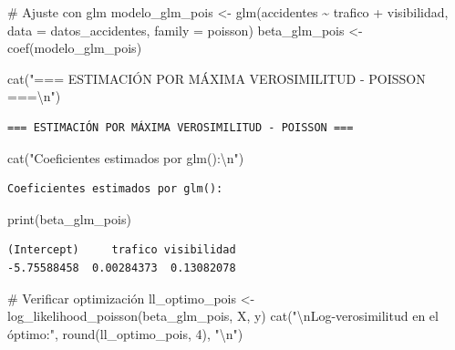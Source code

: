 \documentclass[
  letterpaper,
  DIV=11,
  numbers=noendperiod]{scrreprt}
\newenvironment{Shaded}{\begin{snugshade}}{\end{snugshade}}
\newcommand{\AttributeTok}[1]{\textcolor[rgb]{0.40,0.45,0.13}{#1}}
\newcommand{\CommentTok}[1]{\textcolor[rgb]{0.37,0.37,0.37}{#1}}
\newcommand{\DecValTok}[1]{\textcolor[rgb]{0.68,0.00,0.00}{#1}}
\newcommand{\FunctionTok}[1]{\textcolor[rgb]{0.28,0.35,0.67}{#1}}
\newcommand{\NormalTok}[1]{\textcolor[rgb]{0.00,0.23,0.31}{#1}}
\newcommand{\OtherTok}[1]{\textcolor[rgb]{0.00,0.23,0.31}{#1}}
\newcommand{\SpecialCharTok}[1]{\textcolor[rgb]{0.37,0.37,0.37}{#1}}
\newcommand{\StringTok}[1]{\textcolor[rgb]{0.13,0.47,0.30}{#1}}
\begin{document}
\begin{tcolorbox}
\begin{Shaded}
\begin{Highlighting}[]
\CommentTok{\# Ajuste con glm}
\NormalTok{modelo\_glm\_pois }\OtherTok{\textless{}{-}} \FunctionTok{glm}\NormalTok{(accidentes }\SpecialCharTok{\textasciitilde{}}\NormalTok{ trafico }\SpecialCharTok{+}\NormalTok{ visibilidad, }
                       \AttributeTok{data =}\NormalTok{ datos\_accidentes, }\AttributeTok{family =}\NormalTok{ poisson)}
\NormalTok{beta\_glm\_pois }\OtherTok{\textless{}{-}} \FunctionTok{coef}\NormalTok{(modelo\_glm\_pois)}

\FunctionTok{cat}\NormalTok{(}\StringTok{"=== ESTIMACIÓN POR MÁXIMA VEROSIMILITUD {-} POISSON ===}\SpecialCharTok{\textbackslash{}n}\StringTok{"}\NormalTok{)}
\end{Highlighting}
\end{Shaded}

\begin{verbatim}
=== ESTIMACIÓN POR MÁXIMA VEROSIMILITUD - POISSON ===
\end{verbatim}

\begin{Shaded}
\begin{Highlighting}[]
\FunctionTok{cat}\NormalTok{(}\StringTok{"Coeficientes estimados por glm():}\SpecialCharTok{\textbackslash{}n}\StringTok{"}\NormalTok{)}
\end{Highlighting}
\end{Shaded}

\begin{verbatim}
Coeficientes estimados por glm():
\end{verbatim}

\begin{Shaded}
\begin{Highlighting}[]
\FunctionTok{print}\NormalTok{(beta\_glm\_pois)}
\end{Highlighting}
\end{Shaded}

\begin{verbatim}
(Intercept)     trafico visibilidad 
-5.75588458  0.00284373  0.13082078 
\end{verbatim}

\begin{Shaded}
\begin{Highlighting}[]
\CommentTok{\# Verificar optimización}
\NormalTok{ll\_optimo\_pois }\OtherTok{\textless{}{-}} \FunctionTok{log\_likelihood\_poisson}\NormalTok{(beta\_glm\_pois, X, y)}
\FunctionTok{cat}\NormalTok{(}\StringTok{"}\SpecialCharTok{\textbackslash{}n}\StringTok{Log{-}verosimilitud en el óptimo:"}\NormalTok{, }\FunctionTok{round}\NormalTok{(ll\_optimo\_pois, }\DecValTok{4}\NormalTok{), }\StringTok{"}\SpecialCharTok{\textbackslash{}n}\StringTok{"}\NormalTok{)}
\end{Highlighting}
\end{Shaded}


\end{tcolorbox}
\end{document}
